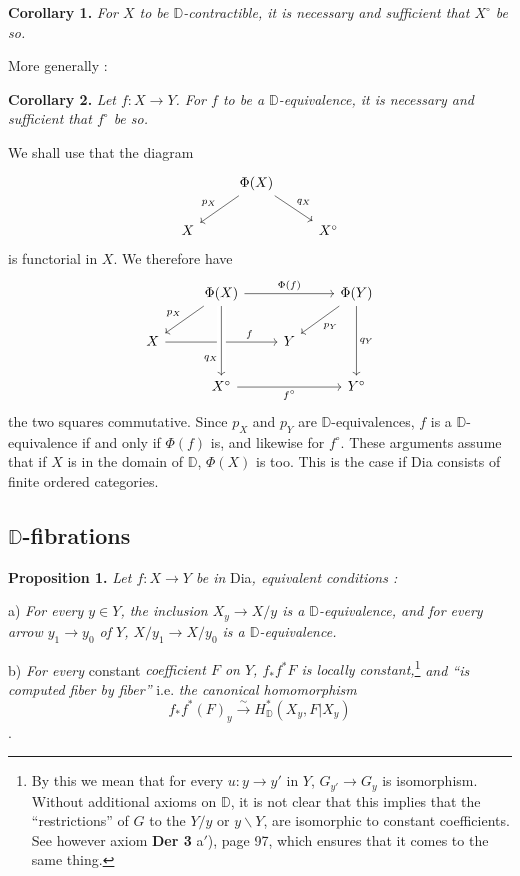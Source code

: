 \documentclass[11pt]{article}
\newcommand{\printedpage}[1]{\marginpar{\footnotesize p.~#1}}
\newcommand{\msp}[1]{\marginpar{\footnotesize [#1]}}
\newcommand{\D}{\mathbb{D}}
\newcommand{\Dia}{\textsf{Dia}}
\newcommand{\bs}{\backslash}
\begin{document}
\textbf{Corollary 1.} \textit{For $X$ to be $\D$-contractible, it is necessary and sufficient that $X^\circ$ be so.}

\hspace*{\parindent}More generally :

\textbf{Corollary 2.} \textit{Let $f : X \to Y$. For $f$ to be a $\D$-equivalence, it is necessary and sufficient that $f^\circ$ be so.}

\hspace*{\parindent}We shall use that the diagram
\[
\begin{tikzcd}
& \Phi(X) \arrow[dl, "p_X"'] \arrow[dr, "q_X"] & \\
X & & X^\circ
\end{tikzcd}
\]
is functorial in $X$. We therefore have
\[
\begin{tikzcd}
& \Phi(X) \arrow[rr, "\Phi(f)"] \arrow[dl, "p_X"'] & & \Phi(Y) \arrow[dl, "p_Y"] \arrow[dd, "q_Y"] \\
X \arrow[rr, "f" near end] \arrow[from=1-2, to=3-2, "q_X"' near end, crossing over] & & Y & \\
& X^\circ \arrow[rr, "f^\circ"'] & & Y^\circ
\end{tikzcd}
\]
the two squares commutative. Since $p_X$ and $p_Y$ are $\D$-equivalences, $f$ is a $\D$-equivalence if and only if $\Phi(f)$ is, and likewise for $f^\circ$. These arguments assume that if $X$ is in the domain of $\D$, $\Phi(X)$ is too. This is the case if \Dia{} consists of finite ordered categories.

\printedpage{46}
\msp{page 76}

\subsection*{$\D$-fibrations}

\textbf{Proposition 1.} \textit{Let $f : X \to Y$ be in} \Dia\textit{, equivalent conditions :}

\hspace*{\parindent}a) \textit{For every $y \in Y$, the inclusion $X_y \to X/y$ is a $\D$-equivalence, and for every arrow $y_1 \to y_0$ of $Y$, $X/y_1 \to X/y_0$ is a $\D$-equivalence.}

\hspace*{\parindent}b) \textit{For every} constant \textit{coefficient $F$ on $Y$, $f_*f^*F$ is locally constant,}\footnote[33]{By this we mean that for every $u : y \to y'$ in $Y$, $G_{y'} \to G_y$ is isomorphism. Without additional axioms on $\D$, it is not clear that this implies that the ``restrictions'' of $G$ to the $Y/y$ or $y\bs Y$, are isomorphic to constant coefficients. See however axiom \textbf{Der 3} a$'$), page 97, which ensures that it comes to the same thing.} \textit{and ``is computed fiber by fiber''} i.e. \textit{the canonical homomorphism}
\[
f_*f^*(F)_y \overset{\sim}{\longrightarrow} H^*_{\D}(X_y, F|X_y)
\]
.
\end{document}
